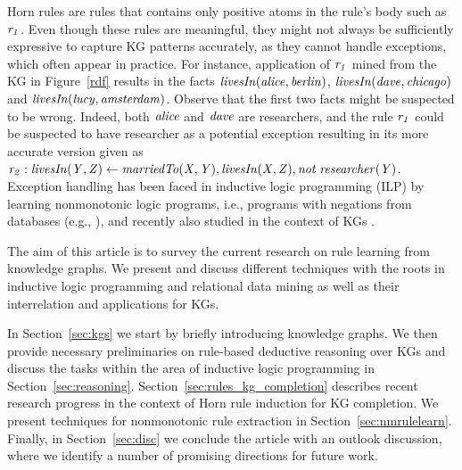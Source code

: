 Horn rules are rules that contains only positive atoms in the rule's body such as $\mathit{r_1}$. Even though these rules are meaningful, they might not always be sufficiently expressive to capture KG patterns accurately, as they cannot handle exceptions, which often appear in practice. 
For instance, application of $\mathit{r_1}$ mined from the KG in Figure~\ref{rdf} results in the facts $\mathit{livesIn(alice,berlin)}$, $\mathit{livesIn(dave,chicago)}$ and $\mathit{livesIn(lucy,amsterdam)}$. Observe that the first two facts might be suspected to be wrong. Indeed, both $\mathit{alice}$ and $\mathit{dave}$ are researchers, and the rule $\mathit{r_1}$ could be suspected to have researcher as a potential exception resulting in its more accurate version given as $\mathit{r_2:\;}\mathit{livesIn(Y,Z)}\leftarrow \mathit{marriedTo(X,Y),livesIn(X,Z), not\;researcher(Y)}$.
Exception handling has been faced in inductive logic programming (ILP) by learning nonmonotonic logic programs, i.e., programs with negations from databases (e.g., \cite{DBLP:conf/ijcai/InoueK97,DBLP:journals/tocl/Sakama05,XHAIL}), and recently also studied in the context of KGs \cite{gad2016,rumis}.


The aim of this article is to survey the current research on rule learning from knowledge graphs. We present and discuss different techniques with the roots in inductive logic programming and relational data mining as well as their interrelation and applications for KGs. 

In Section~\ref{sec:kgs} we start by briefly introducing knowledge graphs. We then provide necessary preliminaries on rule-based deductive reasoning over KGs and discuss the tasks within the area of inductive logic programming in Section~\ref{sec:reasoning}. Section~\ref{sec:rules_kg_completion} %
describes recent research progress in the context of Horn rule induction for KG completion. We present techniques for nonmonotonic rule extraction in Section~\ref{sec:nmrulelearn}. Finally, in Section~\ref{sec:disc} we conclude the article with an outlook discussion, where we identify a number of promising directions for future work.

